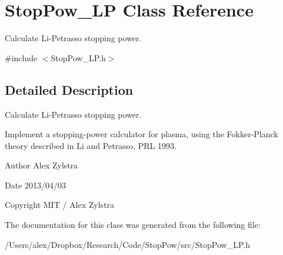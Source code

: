 \hypertarget{class_stop_pow___l_p}{\section{Stop\-Pow\-\_\-\-L\-P Class Reference}
\label{class_stop_pow___l_p}
}


Calculate Li-\/\-Petrasso stopping power.  




{\ttfamily \#include $<$Stop\-Pow\-\_\-\-L\-P.\-h$>$}



\subsection{Detailed Description}
Calculate Li-\/\-Petrasso stopping power. 

Implement a stopping-\/power calculator for plasma, using the Fokker-\/\-Planck theory described in Li and Petrasso, P\-R\-L 1993.

\begin{DoxyAuthor}{Author}
Alex Zylstra 
\end{DoxyAuthor}
\begin{DoxyDate}{Date}
2013/04/03 
\end{DoxyDate}
\begin{DoxyCopyright}{Copyright}
M\-I\-T / Alex Zylstra 
\end{DoxyCopyright}


The documentation for this class was generated from the following file\-:\begin{DoxyCompactItemize}
\item 
/\-Users/alex/\-Dropbox/\-Research/\-Code/\-Stop\-Pow/src/Stop\-Pow\-\_\-\-L\-P.\-h\end{DoxyCompactItemize}
